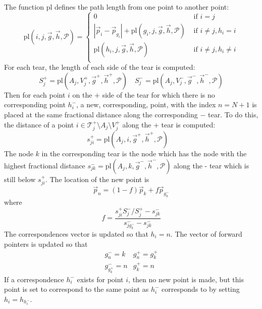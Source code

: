 \documentclass{article}
\begin{document}
The function $\mathrm{pl}$ defines the path length from one point to another
point:
\begin{displaymath}
  \mathrm{pl}(i, j, \vec{g}, \vec{h}, \mathcal{P}) = \left\{ 
    \begin{array}{ll}
      0 & \mbox{ if } i = j \\
      |\vec{p}_i-\vec{p}_{g_i}| + \mathrm{pl}(g_i, j, \vec{g}, \vec{h}, \mathcal{P}) & \mbox{ if } i \ne j, h_i=i \\
      \mathrm{pl}(h_i, j, \vec{g}, \vec{h}, \mathcal{P})    & \mbox{ if } i \ne j, h_i\ne i \\
    \end{array}\right.
\end{displaymath}
For each tear, the length of each side of the tear is computed:
\begin{displaymath}
  S^+_j = \mathrm{pl}(A_j, V^+_j, \vec{g}^+, \vec{h}^+, \mathcal{P}) \quad 
  S^-_j = \mathrm{pl}(A_j, V^-_j, \vec{g}^-, \vec{h}^-, \mathcal{P})
\end{displaymath}
Then for each point $i$ on the $+$ side of the tear for which there is
no corresponding point $h_i^-$, a new, corresponding, point, with the
index $n=N+1$ is placed at the same fractional distance along the
corresponding $-$ tear. To do this, the distance of a point
$i\in{\mathcal{T}^+_j}\setminus A_j \setminus V^+_j$ along the + tear
is computed:
\begin{displaymath}
  s^+_{ji} = \mathrm{pl}(A_j, i, \vec{g}^+, \vec{h}^+, \mathcal{P}) \quad 
\end{displaymath}
The node $k$ in the corresponding tear is the node which has the node
with the highest fractional distance $s^-_{jk}=\mathrm{pl}(A_j, k,
\vec{g}^-, \vec{h}^-, \mathcal{P})$ along the - tear which is still below
$s^+_{ji}$. The location of the new point is
\begin{displaymath}
  \vec{p}_n = (1-f)\vec{p}_k + f\vec{p}_{g^-_k}
\end{displaymath}
where
\begin{displaymath}
  f = \frac{s^+_{ji}S^-_j/S^+_j-s^-_{jk}}{s^-_{jg^-_k}-s^-_{jk}}
\end{displaymath}
The correspondences vector is updated so that $h_i = n$. The vector of
forward pointers is updated so that
\begin{displaymath}
  \begin{array}{ll}
    g^-_n = k     & g^+_n = g^+_k \\
    g^-_{g^+_k} = n & g^+_k = n 
  \end{array}
\end{displaymath}
If a correspondence $h^-_i$ exists for point $i$, then no new point is
made, but this point is set to correspond to the same point as $h^-_i$
corresponds to by setting $h_i = h_{h^-_i}$. 
\end{document}
